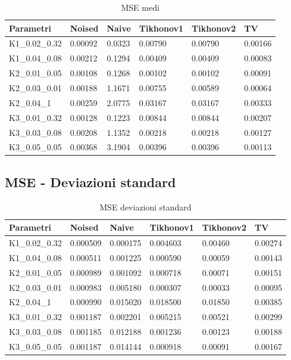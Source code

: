 \documentclass[12pt]{article}
\begin{document}
    \begin{table}[!ht]
    \centering
    \begin{tabular}{|l|l|l|l|l|l|}
    \hline
        Parametri & Noised & Naive & Tikhonov1 & Tikhonov2 & TV \\ \hline
        K1\_0.02\_0.32 & 0.00092 & 0.0323 & 0.00790 & 0.00790 & 0.00166 \\ \hline
        K1\_0.04\_0.08 & 0.00212 & 0.1294 & 0.00409 & 0.00409 & 0.00083 \\ \hline
        K2\_0.01\_0.05 & 0.00108 & 0.1268 & 0.00102 & 0.00102 & 0.00091 \\ \hline
        K2\_0.03\_0.01 & 0.00188 & 1.1671 & 0.00755 & 0.00589 & 0.00064 \\ \hline
        K2\_0.04\_1    & 0.00259 & 2.0775 & 0.03167 & 0.03167 & 0.00333 \\ \hline
        K3\_0.01\_0.32 & 0.00128 & 0.1223 & 0.00844 & 0.00844 & 0.00207 \\ \hline
        K3\_0.03\_0.08 & 0.00208 & 1.1352 & 0.00218 & 0.00218 & 0.00127 \\ \hline
        K3\_0.05\_0.05 & 0.00368 & 3.1904 & 0.00396 & 0.00396 & 0.00113 \\ \hline
    \end{tabular}
    \caption{MSE medi }
    \label{table:10}
    \end{table}

    \subsection{MSE - Deviazioni standard}
    \begin{table}[!ht]
    \centering
    \begin{tabular}{|l|l|l|l|l|l|}
    \hline
        Parametri & Noised & Naive & Tikhonov1 & Tikhonov2 & TV \\ \hline
        K1\_0.02\_0.32 & 0.000509 & 0.000175 & 0.004603 & 0.00460 & 0.00274 \\ \hline
        K1\_0.04\_0.08 & 0.000511 & 0.001225 & 0.000590 & 0.00059 & 0.00143 \\ \hline
        K2\_0.01\_0.05 & 0.000989 & 0.001092 & 0.000718 & 0.00071 & 0.00151 \\ \hline
        K2\_0.03\_0.01 & 0.000983 & 0.005180 & 0.000307 & 0.00033 & 0.00095 \\ \hline
        K2\_0.04\_1    & 0.000990 & 0.015020 & 0.018500 & 0.01850 & 0.00385 \\ \hline
        K3\_0.01\_0.32 & 0.001187 & 0.002201 & 0.005215 & 0.00521 & 0.00299 \\ \hline
        K3\_0.03\_0.08 & 0.001185 & 0.012188 & 0.001236 & 0.00123 & 0.00188 \\ \hline
        K3\_0.05\_0.05 & 0.001187 & 0.014144 & 0.000918 & 0.00091 & 0.00167 \\ \hline
    \end{tabular}
    \caption{MSE deviazioni standard}
    \label{table:12}
    \end{table}
    
\end{document}
